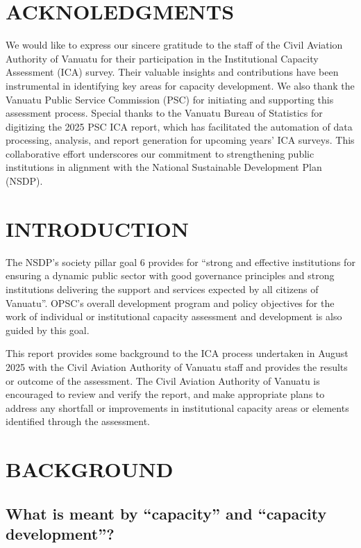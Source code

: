 \documentclass[
  10pt,
]{report}
\begin{document}
\endgroup{}

\chapter{ACKNOLEDGMENTS}\label{acknoledgments}

We would like to express our sincere gratitude to the staff of the Civil
Aviation Authority of Vanuatu for their participation in the
Institutional Capacity Assessment (ICA) survey. Their valuable insights
and contributions have been instrumental in identifying key areas for
capacity development. We also thank the Vanuatu Public Service
Commission (PSC) for initiating and supporting this assessment process.
Special thanks to the Vanuatu Bureau of Statistics for digitizing the
2025 PSC ICA report, which has facilitated the automation of data
processing, analysis, and report generation for upcoming years' ICA
surveys. This collaborative effort underscores our commitment to
strengthening public institutions in alignment with the National
Sustainable Development Plan (NSDP).

\chapter{INTRODUCTION}\label{introduction}

The NSDP's society pillar goal 6 provides for ``strong and effective
institutions for ensuring a dynamic public sector with good governance
principles and strong institutions delivering the support and services
expected by all citizens of Vanuatu''. OPSC's overall development
program and policy objectives for the work of individual or
institutional capacity assessment and development is also guided by this
goal.

This report provides some background to the ICA process undertaken in
August 2025 with the Civil Aviation Authority of Vanuatu staff and
provides the results or outcome of the assessment. The Civil Aviation
Authority of Vanuatu is encouraged to review and verify the report, and
make appropriate plans to address any shortfall or improvements in
institutional capacity areas or elements identified through the
assessment.

\chapter{BACKGROUND}\label{background}

\section{What is meant by ``capacity'' and ``capacity
development''?}\label{what-is-meant-by-capacity-and-capacity-development}
\end{document}
